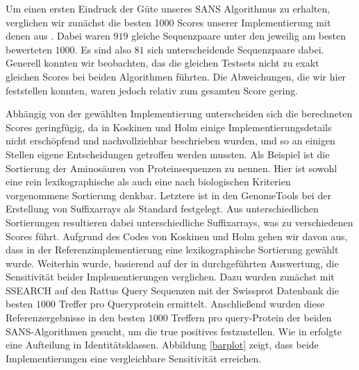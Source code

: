 \documentclass{article}
\begin{document}
Um einen ersten Eindruck der Güte unseres SANS Algorithmus zu erhalten, verglichen wir zunächst die besten 1000 Scores unserer Implementierung
mit denen aus \cite{Holm}. Dabei waren $919$ gleiche Sequenzpaare unter den jeweilig am besten bewerteten $1000$. Es sind also $81$ sich unterscheidende
Sequenzpaare dabei. Generell konnten wir beobachten, das die gleichen Testsets nicht zu exakt gleichen Scores bei beiden Algorithmen führten. Die
Abweichungen, die wir hier feststellen konnten, waren jedoch relativ zum gesamten Score gering.

Abhängig von der gewählten Implementierung unterscheiden sich die berechneten Scores geringfügig,  da in Koskinen und Holm  \cite{Holm} einige Implementierungsdetails nicht erschöpfend und nachvollziehbar beschrieben wurden,
und so an einigen Stellen eigene Entscheidungen getroffen werden mussten. Als Beispiel ist die Sortierung der Aminosäuren von Proteinsequenzen
zu nennen. Hier ist sowohl eine rein lexikographische als auch eine nach biologischen Kriterien vorgenommene Sortierung denkbar. Letztere ist in den GenomeTools \cite{gtools} bei der Erstellung von Suffixarrays als Standard festgelegt. Aus unterschiedlichen
Sortierungen resultieren dabei unterschiedliche Suffixarrays, was zu verschiedenen Scores führt. Aufgrund des Codes von Koskinen und Holm gehen wir davon aus, dass in der Referenzimplementierung eine lexikographische Sortierung gewählt wurde. 
Weiterhin wurde, basierend auf der in \cite{Holm} durchgeführten Auswertung, die Sensitivität beider Implementierungen verglichen. Dazu wurden zunächst mit SSEARCH auf den Rattus Query
Sequenzen mit der Swissprot Datenbank die besten $1000$ Treffer pro Queryprotein ermittelt. Anschließend wurden diese Referenzergebnisse in den besten $1000$ Treffern pro query-Protein der beiden SANS-Algorithmen gesucht, um die true positives festzustellen. Wie in \cite{Holm} erfolgte eine Aufteilung in Identitätsklassen. Abbildung \ref{barplot} zeigt, dass beide
Implementierungen eine vergleichbare Sensitivität erreichen.
\end{document}
